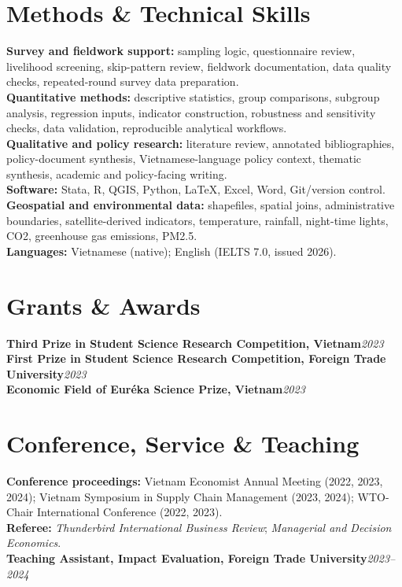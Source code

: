 \documentclass[10pt]{article}
\begin{document}
\section{Methods \& Technical Skills}
\textbf{Survey and fieldwork support:} sampling logic, questionnaire review, livelihood screening, skip-pattern review, fieldwork documentation, data quality checks, repeated-round survey data preparation.\\
\textbf{Quantitative methods:} descriptive statistics, group comparisons, subgroup analysis, regression inputs, indicator construction, robustness and sensitivity checks, data validation, reproducible analytical workflows.\\
\textbf{Qualitative and policy research:} literature review, annotated bibliographies, policy-document synthesis, Vietnamese-language policy context, thematic synthesis, academic and policy-facing writing.\\
\textbf{Software:} Stata, R, QGIS, Python, \LaTeX, Excel, Word, Git/version control.\\
\textbf{Geospatial and environmental data:} shapefiles, spatial joins, administrative boundaries, satellite-derived indicators, temperature, rainfall, night-time lights, CO2, greenhouse gas emissions, PM2.5.\\
\textbf{Languages:} Vietnamese (native); English (IELTS 7.0, issued 2026).

\section{Grants \& Awards}
\textbf{Third Prize in Student Science Research Competition, Vietnam}\hfill\emph{2023}\\
\textbf{First Prize in Student Science Research Competition, Foreign Trade University}\hfill\emph{2023}\\
\textbf{Economic Field of Eur\'eka Science Prize, Vietnam}\hfill\emph{2023}

\section{Conference, Service \& Teaching}
\textbf{Conference proceedings:} Vietnam Economist Annual Meeting (2022, 2023, 2024); Vietnam Symposium in Supply Chain Management (2023, 2024); WTO-Chair International Conference (2022, 2023).\\
\textbf{Referee:} \textit{Thunderbird International Business Review}; \textit{Managerial and Decision Economics}.\\
\textbf{Teaching Assistant, Impact Evaluation, Foreign Trade University}\hfill\emph{2023--2024}
\end{document}
